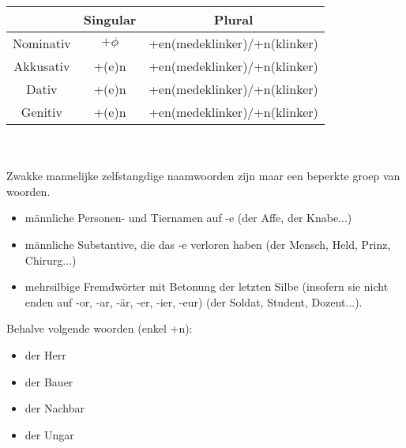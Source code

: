 \documentclass[main.tex]{subfiles}
\begin{document}
\begin{minipage}[t]{0.70\textwidth}
\begin{tabular}{|c|c|c|}
\hline 
\rowcolor{gray}
& Singular & Plural \\ 
\hline 
\cellcolor[gray]{0.8}Nominativ & $+\phi$ & +en(medeklinker)/+n(klinker)\\ 
\hline 
\cellcolor[gray]{0.8}Akkusativ & +(e)n & +en(medeklinker)/+n(klinker)\\ 
\hline 
\cellcolor[gray]{0.8}Dativ & +(e)n & +en(medeklinker)/+n(klinker)\\ 
\hline 
\cellcolor[gray]{0.8}Genitiv & +(e)n & +en(medeklinker)/+n(klinker)\\ 
\hline 
\end{tabular} 
\\
\\
Zwakke mannelijke zelfstangdige naamwoorden zijn maar een beperkte groep van woorden.
\begin{itemize}
\item männliche Personen- und Tiernamen auf -e (der Affe, der Knabe...)
\item männliche Substantive, die das -e verloren haben (der Mensch, Held, Prinz, Chirurg...)
\item mehrsilbige Fremdwörter mit Betonung der letzten Silbe (insofern sie nicht enden auf -or, -ar, -är, -er, -ier, -eur) (der Soldat, Student, Dozent...).

\end{itemize}
\end{minipage}
\begin{minipage}[t]{0.3\textwidth}
Behalve volgende woorden (enkel +n):
\begin{itemize}
\item der Herr
\item der Bauer
\item der Nachbar
\item der Ungar
\end{itemize}

\end{minipage}
\end{document}
